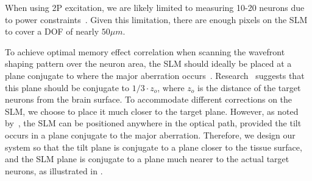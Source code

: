 When using 2P excitation, we are likely limited to measuring 10-20 neurons due to power constraints~\cite{Davis2024Optical}. Given this limitation, there are enough pixels on the SLM to cover a DOF of nearly $50\mu m$.








To achieve optimal memory effect correlation when scanning the wavefront shaping pattern over the neuron area, the SLM should ideally be placed at a plane conjugate to where the major aberration occurs~\cite{Mertz:15,Park2015,Tao2017}. Research~\cite{osnabrugge2017generalized,SeeThroughSubmission} suggests that this plane should be conjugate to $1/3\cdot z_o$,  where $z_o$
is the distance of the target neurons from the brain surface.
To accommodate different corrections on the SLM, we choose to place it much closer to the target plane. However, as noted by~\cite{Papadopoulos2020}, the SLM can be positioned anywhere in the optical path, provided the tilt occurs in a plane conjugate to the major aberration. Therefore, we design our system so that the tilt plane is conjugate to a plane closer to the tissue surface, and the SLM plane is conjugate to a plane much nearer to the actual target neurons, as illustrated in .

